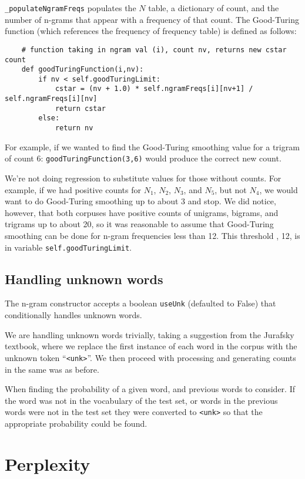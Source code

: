 \documentclass{article}
\begin{document}
\texttt{\_populateNgramFreqs} populates the $N$ table, a dictionary of count, and the number of n-grams that appear with a frequency of that count. The Good-Turing function (which references the frequency of frequency table) is defined as follows:

{\small\begin{verbatim}
    # function taking in ngram val (i), count nv, returns new cstar count
    def goodTuringFunction(i,nv):
        if nv < self.goodTuringLimit:
            cstar = (nv + 1.0) * self.ngramFreqs[i][nv+1] / self.ngramFreqs[i][nv]
            return cstar
        else:
            return nv
\end{verbatim}}

For example, if we wanted to find the Good-Turing smoothing value for a trigram of count 6: \texttt{goodTuringFunction(3,6)} would produce the correct new count.

We're not doing regression to substitute values for those without counts. For example, if we had positive counts for $N_1$, $N_2$, $N_3$, and $N_5$, but not $N_4$, we would want to do Good-Turing smoothing up to about 3 and stop. We did notice, however, that both corpuses have positive counts of unigrams, bigrams, and trigrams up to about 20, so it was reasonable to assume that Good-Turing smoothing can be done for n-gram frequencies less than 12. This threshold , 12, is in variable \texttt{self.goodTuringLimit}.

\subsection{Handling unknown words}
The n-gram constructor accepts a boolean \texttt{useUnk} (defaulted to False) that conditionally handles unknown words.\par
We are handling unknown words trivially, taking a suggestion from the Jurafsky textbook, where we replace the first instance of each word in the corpus with the unknown token ``\texttt{<unk>}''. We then proceed with processing and generating counts in the same was as before.

When finding the probability of a given word, and previous words to consider. If the word was not in the vocabulary of the test set, or words in the previous words were not in the test set they were converted to \texttt{<unk>} so that the appropriate probability could be found.

\section{Perplexity}
\end{document}

